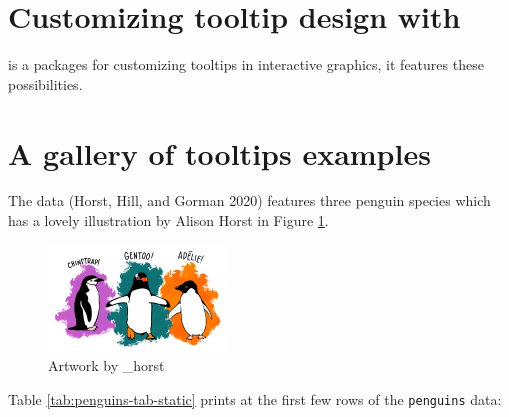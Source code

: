 \hypertarget{customizing-tooltip-design-with}{%
\section{\texorpdfstring{Customizing tooltip design with }{Customizing tooltip design with }}\label{customizing-tooltip-design-with}}

 is a packages for customizing tooltips in interactive graphics, it features these possibilities.

\hypertarget{a-gallery-of-tooltips-examples}{%
\section{A gallery of tooltips examples}\label{a-gallery-of-tooltips-examples}}

The  data (Horst, Hill, and Gorman 2020) features three penguin species which has a lovely illustration by Alison Horst in Figure \ref{fig:penguins-alison}.

\begin{figure}
\includegraphics[width=1\linewidth,height=0.3\textheight]{figures/penguins} \caption{Artwork by \@allison\_horst}\label{fig:penguins-alison}
\end{figure}

Table \ref{tab:penguins-tab-static} prints at the first few rows of the \texttt{penguins} data:

